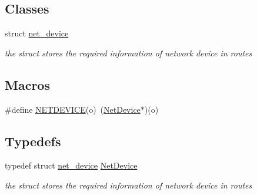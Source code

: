 \subsection*{Classes}
\begin{DoxyCompactItemize}
\item 
struct \hyperlink{structnet__device}{net\+\_\+device}
\begin{DoxyCompactList}\small\item\em the struct stores the required information of network device in routes \end{DoxyCompactList}\end{DoxyCompactItemize}
\subsection*{Macros}
\begin{DoxyCompactItemize}
\item 
\#define \hyperlink{gnode-object_8h_a92eeaa07ea1bf740872e6f0fc1cf0caf}{N\+E\+T\+D\+E\+V\+I\+CE}(o)~(\hyperlink{gnode-object_8h_ab9c23d3a2ba4d9157b5ab053f61388dc}{Net\+Device}$\ast$)(o)
\end{DoxyCompactItemize}
\subsection*{Typedefs}
\begin{DoxyCompactItemize}
\item 
typedef struct \hyperlink{structnet__device}{net\+\_\+device} \hyperlink{gnode-object_8h_ab9c23d3a2ba4d9157b5ab053f61388dc}{Net\+Device}
\begin{DoxyCompactList}\small\item\em the struct stores the required information of network device in routes \end{DoxyCompactList}\end{DoxyCompactItemize}
